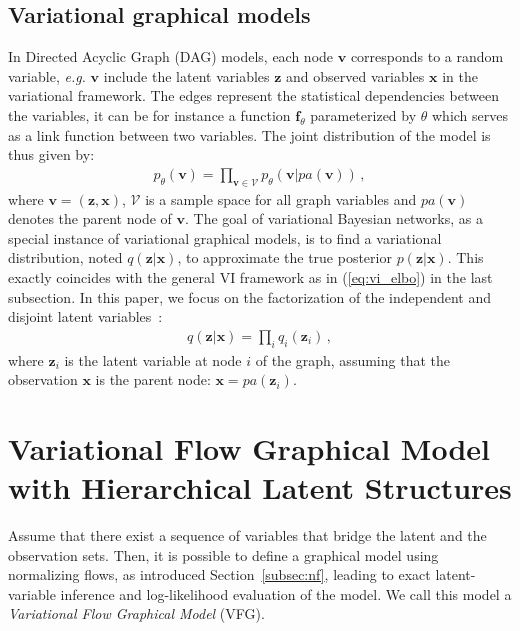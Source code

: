 \documentclass{article} %
\begin{document}
\subsection{Variational graphical models}
In Directed Acyclic Graph (DAG) models, each node $\mathbf{v}$ corresponds to a random variable, \textit{e.g.} $\mathbf{v}$ include the latent variables $\mathbf{z}$ and observed variables $\mathbf{x}$ in the variational framework. 
The edges represent the statistical dependencies between the variables, it can be for instance a function $\mathbf{f}_\theta$ parameterized by $\theta$ which serves as a link function between two variables.  
The joint distribution of the model is thus given by:
\begin{align}
    p_\theta(\mathbf{v}) = \prod_{\mathbf{v} \in \mathcal{V}} p_\theta(\mathbf{v}|pa(\mathbf{v})) \, , 
\end{align}
where $\mathbf{v}=(\mathbf{z}, \mathbf{x})$, $\mathcal{V}$ is a sample space for all graph variables and $pa(\mathbf{v})$ denotes the parent node of $\mathbf{v}$. 
The goal of variational Bayesian networks, as a special instance of variational graphical models, is to find a variational distribution, noted $q(\mathbf{z}|\mathbf{x})$, to approximate the true posterior $p(\mathbf{z}|\mathbf{x})$. 
This exactly coincides with the general VI framework as in (\ref{eq:vi_elbo}) in the last subsection. 
In this paper, we focus on the factorization of the independent and disjoint latent variables~\citep{bishop2003vibes}:
\begin{align}
    q(\mathbf{z}|\mathbf{x}) = \prod_i q_i(\mathbf{z}_i)\, ,
\end{align}
where $\mathbf{z}_i$ is the latent variable at node $i$ of the graph, assuming that the observation $\mathbf{x}$ is the parent node: $\mathbf{x}=pa(\mathbf{z}_i)$. 

\section{Variational Flow Graphical Model with Hierarchical Latent Structures}\label{sec:main}

Assume that there exist a sequence of variables that bridge the latent and the observation sets.
Then, it is possible to define a graphical model using normalizing flows, as introduced Section~\ref{subsec:nf}, leading to exact latent-variable inference and log-likelihood evaluation of the model. 
We call this model a \textit{Variational Flow Graphical Model} (VFG).
\end{document}
